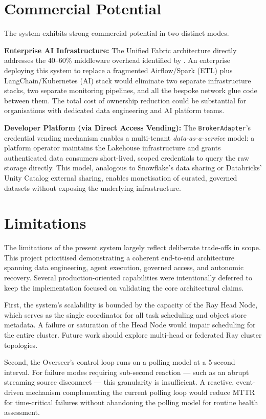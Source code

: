 \documentclass[12pt, a4paper]{report}
\begin{document}
\section{Commercial Potential}
\label{sec:commercial}

The system exhibits strong commercial potential in two distinct modes.

\textbf{Enterprise AI Infrastructure:}
The Unified Fabric architecture directly addresses the 40--60\% middleware overhead
identified by \citet{mckinsey2024}.
An enterprise deploying this system to replace a fragmented Airflow/Spark (ETL) plus
LangChain/Kubernetes (AI) stack would eliminate two separate infrastructure stacks, two
separate monitoring pipelines, and all the bespoke network glue code between them.
The total cost of ownership reduction could be substantial for organisations with
dedicated data engineering and AI platform teams.

\textbf{Developer Platform (via Direct Access Vending):}
The \texttt{BrokerAdapter}'s credential vending mechanism enables a multi-tenant
\emph{data-as-a-service} model: a platform operator maintains the Lakehouse
infrastructure and grants authenticated data consumers short-lived, scoped credentials
to query the raw storage directly.
This model, analogous to Snowflake's data sharing or Databricks' Unity Catalog
external sharing, enables monetisation of curated, governed datasets without exposing
the underlying infrastructure.

\section{Limitations}
\label{sec:limitations}

The limitations of the present system largely reflect deliberate trade-offs in scope.
This project prioritised demonstrating a coherent end-to-end architecture spanning
data engineering, agent execution, governed access, and autonomic recovery.
Several production-oriented capabilities were intentionally deferred to keep the
implementation focused on validating the core architectural claims.

First, the system's scalability is bounded by the capacity of the Ray Head Node, which
serves as the single coordinator for all task scheduling and object store metadata.
A failure or saturation of the Head Node would impair scheduling for the entire cluster.
Future work should explore multi-head or federated Ray cluster topologies.

Second, the Overseer's control loop runs on a polling model at a 5-second interval.
For failure modes requiring sub-second reaction — such as an abrupt streaming source
disconnect — this granularity is insufficient.
A reactive, event-driven mechanism complementing the current polling loop would reduce
MTTR for time-critical failures without abandoning the polling model for routine
health assessment.
\end{document}
